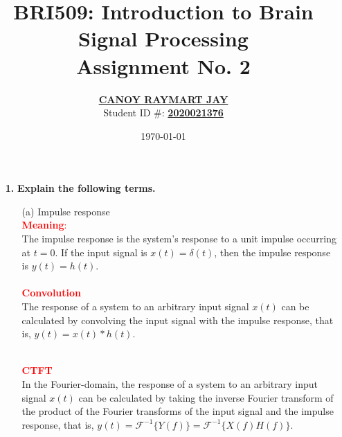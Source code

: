 \documentclass[a4paper, 12pt]{article}
\begin{document}
\title{BRI509: Introduction to Brain Signal Processing \\ Assignment No. 2}
\author{\underline{\textbf{CANOY RAYMART JAY}} \\ Student ID \#: \underline{\textbf{2020021376}}}
\date{\today}
\maketitle

\begin{itemize}
\item[\textbf{1.}]{\textbf{Explain the following terms.}}
\begin{itemize}
\item[(a)]{Impulse response}\\
\textcolor{red}{\textbf{Meaning}:} \\
The impulse response is the system's response to a unit impulse occurring at $t = 0$. If the input signal is $x(t) = \delta(t)$, then the impulse response is $y(t) = h(t)$.\\
\vspace{0.0001cm} \\
\noindent\textcolor{red}{\textbf{Convolution}}\\
The response of a system to an arbitrary input signal $x(t)$ can be calculated by convolving the input signal with the impulse response, that is, $y(t) = x(t)*h(t)$.
\begin{figure}[h!]
\end{figure}
\begin{figure}[h!]
\end{figure} \\
\noindent\textcolor{red}{\textbf{CTFT}}\\
In the Fourier-domain, the response of a system to an arbitrary input signal $x(t)$ can be calculated by taking the inverse Fourier transform of the product of the Fourier transforms of the input signal and the impulse response, that is, $y(t) = \mathcal{F}^{-1}\{Y(f)\} = \mathcal{F}^{-1}\{X(f)H(f)\}$.
\begin{figure}[h!]
\end{figure}


\end{itemize}
\end{itemize}
\end{document}
